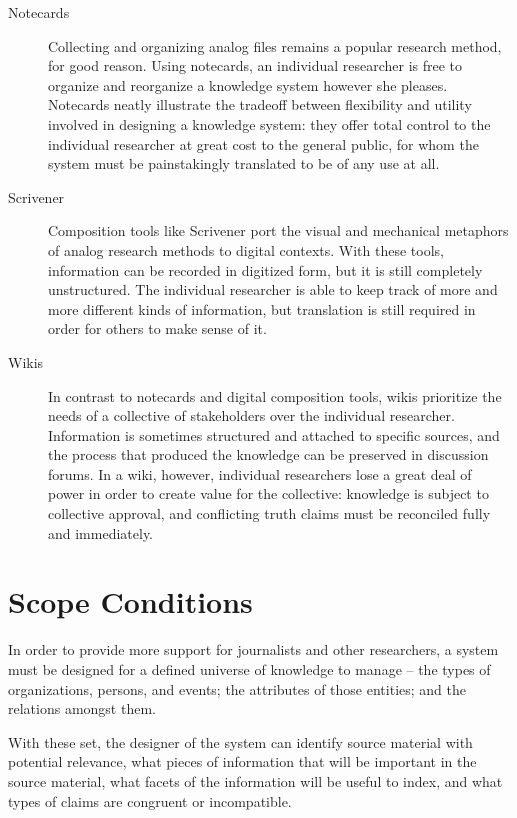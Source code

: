 \documentclass[format=siggraph, review=true]{acmart}
\begin{document}
\begin{description}
  \item [Notecards] Collecting and organizing analog files remains
    a popular research method, for good reason. Using notecards, an
    individual researcher is free to organize and reorganize a
    knowledge system however she pleases. Notecards neatly illustrate
    the tradeoff between flexibility and utility involved in designing
    a knowledge system: they offer total control to the individual
    researcher at great cost to the general public, for whom the system
    must be painstakingly translated to be of any use at all.

  \item [Scrivener] Composition tools like Scrivener port the visual
    and mechanical metaphors of analog research methods to digital
    contexts. With these tools, information can be recorded in digitized
    form, but it is still completely unstructured. The individual
    researcher is able to keep track of more and more different kinds
    of information, but translation is still required in order for others
    to make sense of it.

  \item [Wikis] In contrast to notecards and digital composition tools,
    wikis prioritize the needs of a collective of stakeholders over the
    individual researcher. Information is sometimes structured and
    attached to specific sources, and the process that produced the
    knowledge can be preserved in discussion forums. In a wiki, however,
    individual researchers lose a great deal of power in order to create
    value for the collective: knowledge is subject to collective approval,
    and conflicting truth claims must be reconciled fully and immediately.
\end{description}

\section{Scope Conditions}
In order to provide more support for journalists and other
researchers, a system must be designed for a defined universe of
knowledge to manage -- the types of organizations, persons, and
events; the attributes of those entities; and the relations amongst
them.

With these set, the designer of the system can identify source
material with potential relevance, what pieces of information that
will be important in the source material, what facets of the
information will be useful to index, and what types of claims are
congruent or incompatible.
\end{document}
